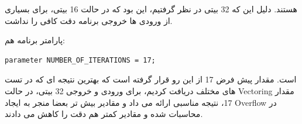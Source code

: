 \documentclass[12pt,titlepage,a4page , tikz , multi,table , svgnames,xcdraw]{article}
\begin{document}
هستند. دلیل این که 32 بیتی در نظر گرفتیم، این بود که در حالت 16 بیتی، برای بسیاری از ورودی ها خروجی برنامه دقت کافی را نداشت.

پارامتر برنامه هم:

\begin{latin}
\begin{verbatim}
parameter NUMBER_OF_ITERATIONS = 17;
\end{verbatim}
\end{latin}

است. مقدار پیش فرض 17 از این رو قرار گرفته است که بهترین نتیجه ای که در تست های مختلف دریافت کردیم، برای ورودی و خروجی 32 بیتی، در حالت Vectoring مقدار 17، نتیجه مناسبی ارائه می داد و مقادیر بیش تر بعضا منجر به ایجاد Overflow در محاسبات شده و مقادیر کمتر هم دقت را کاهش می دادند.




\newpage
\medskip




\end{document}
